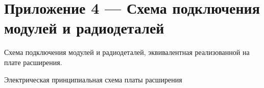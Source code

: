 \section*{Приложение 4 — Схема подключения модулей и радиодеталей}

Схема подключения модулей и радиодеталей, эквивалентная реализованной на плате расширения.


Электрическая принципиальная схема платы расширения

